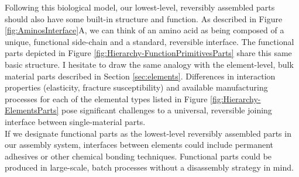 {%
Following this biological model, our lowest-level, reversibly assembled parts should also have some built-in structure and function.  As described in Figure \ref{fig:AminosInterface}A, we can think of an amino acid as being composed of a unique, functional side-chain and a standard, reversible interface.  The functional parts depicted in Figure \ref{fig:Hierarchy-FunctionPrimitivesParts} share this same basic structure.  I hesitate to draw the same analogy with the element-level, bulk material parts described in Section \ref{sec:elements}.  Differences in interaction properties (elasticity, fracture susceptibility) and available manufacturing processes for each of the elemental types listed in Figure \ref{fig:Hierarchy-ElementsParts} pose significant challenges to a universal, reversible joining interface between single-material parts.  \\

If we designate functional parts as the lowest-level reversibly assembled parts in our assembly system, interfaces between elements could include permanent adhesives or other chemical bonding techniques.   Functional parts could be produced in large-scale, batch processes without a disassembly strategy in mind.


%

}
